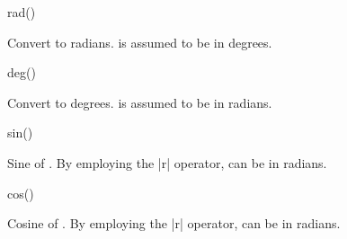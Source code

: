 \begin{math-function}{rad()}

	Convert  to radians.  is assumed to be in degrees.
	
\begin{codeexample}[post=\tt\footnotesize\pgfmathresult]
\end{codeexample}

\end{math-function}

\begin{math-function}{deg()}

	Convert  to degrees.  is assumed to be in radians.
	
\begin{codeexample}[post=\tt\footnotesize\pgfmathresult]
\end{codeexample}

\end{math-function}

\begin{math-function}{sin()}

	Sine of . By employing the |r| operator,  can be in 
	radians.
	
\begin{codeexample}[post=\tt\footnotesize\pgfmathresult]
\end{codeexample}

\begin{codeexample}[post=\tt\footnotesize\pgfmathresult]
\end{codeexample}

\end{math-function}

\begin{math-function}{cos()}

	Cosine of . By employing the |r| operator,  can be in 
	radians.

\begin{codeexample}[post=\tt\footnotesize\pgfmathresult]
\end{codeexample}

\begin{codeexample}[post=\tt\footnotesize\pgfmathresult]
\end{codeexample}

\end{math-function}

